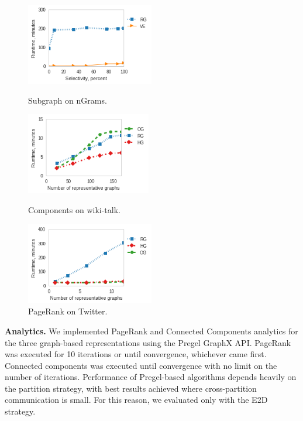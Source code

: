 \begin{figure}
\centering
\begin{minipage}{2.2in}
\centering
\includegraphics[width=2.2in]{figs/subgraph_ngrams_build13.png}
\vspace{-0.2in}
\caption{Subgraph on nGrams.}
\label{fig:subgraphngrams}
\vspace{-0.1in}
\end{minipage}
\begin{minipage}{2.15in}
\centering
\includegraphics[width=2.15in]{figs/cc_wikitalk_build13.png}
\vspace{-0.2in}
\caption{Components on wiki-talk.}
\label{fig:ccwiki}
\vspace{-0.1in}
\end{minipage}
\begin{minipage}{2.2in}
\centering
\includegraphics[width=2.2in]{figs/prank_twitter_build13.png}
\vspace{-0.2in}
\caption{PageRank on Twitter.}
\label{fig:pranktwitter}
\vspace{-0.1in}
\end{minipage}
\end{figure}

{\bf Analytics.}  We implemented PageRank and Connected Components
analytics for the three graph-based representations using the Pregel
GraphX API.  PageRank was executed for 10 iterations or until
convergence, whichever came first.  Connected components was executed
until convergence with no limit on the number of iterations.
Performance of Pregel-based algorithms depends heavily on the
partition strategy, with best results achieved where cross-partition
communication is small.  For this reason, we evaluated only with the
E2D strategy.  

